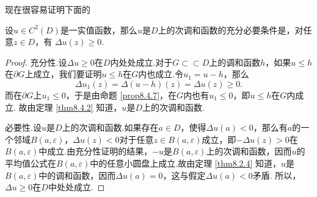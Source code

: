 现在很容易证明下面的
\begin{theorem}\label{eq8.4.8}
  设$u\in C^2(D)$是一实值函数，那么$u$是$D$上的次调和函数的充分必要条件是，对任意$z\in D$，有
  $\Delta u(z)\ge0$.
\end{theorem}
\begin{proof}
  充分性.设$\Delta u\ge0$在$D$内处处成立.对于$G\subset\subset D$上的调和函数$h$，如果$u\le h$在$\partial G$上成立，我们要证明$u\le h$在$G$内也成立.令$u_1=u-h$，那么
  \[
    \Delta u_1(z) = \Delta(u-h)(z) = \Delta u(z)\ge0.
  \]
  而在$\partial G$上$u_1\le0$，于是由命题 \ref{prop8.4.7}，在$G$内也有$u_1\le0$，即$u\le h$在$G$内成立. 故由定理 \ref{thm8.4.2} 知道，$u$是$D$上的次调和函数.

  必要性.设$u$是$D$上的次调和函数.如果存在$a\in D$，使得$\Delta u(a)<0$，那么有$a$的一个邻域$B(a,\varepsilon)$，$\Delta u(z)<0$对于任意$z\in B(a,\varepsilon)$成立，即$-\Delta u(z)>0$在$B(a,\varepsilon)$中成立.由充分性证明的结果，$-u$是$B(a,\varepsilon)$上的次调和函数，因而$u$的平均值公式在$B(a,\varepsilon)$中的任意小圆盘上成立.故由定理 \ref{thm8.2.4} 知道，$u$是$B(a,\varepsilon)$中的调和函数，因而$\Delta u(a)=0$，这与假定$\Delta u(a)<0$矛盾.
  所以，$\Delta u\ge0$在$D$中处处成立.
\end{proof}

